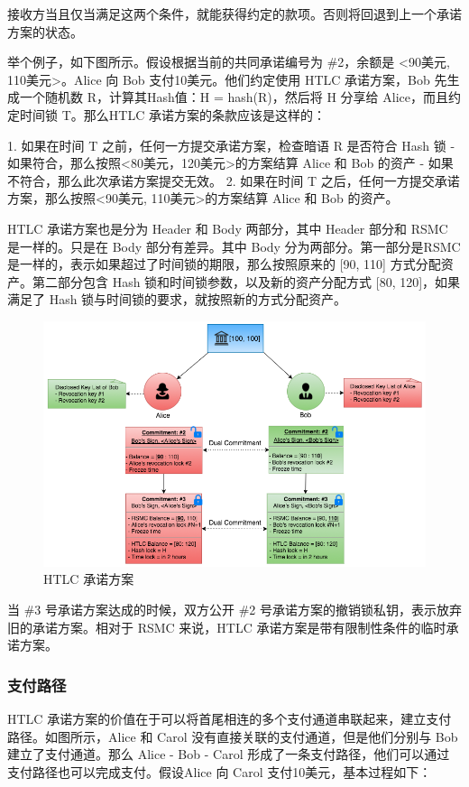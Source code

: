 接收方当且仅当满足这两个条件，就能获得约定的款项。否则将回退到上一个承诺方案的状态。

举个例子，如下图所示。假设根据当前的共同承诺编号为 \#2，余额是 <90美元, 110美元>。Alice 向 Bob 支付10美元。他们约定使用 HTLC 承诺方案，Bob 先生成一个随机数 R，计算其Hash值：H = hash(R)，然后将 H 分享给 Alice，而且约定时间锁 T。那么HTLC 承诺方案的条款应该是这样的：

1. 如果在时间 T 之前，任何一方提交承诺方案，检查暗语 R 是否符合 Hash 锁
- 如果符合，那么按照<80美元，120美元>的方案结算 Alice 和 Bob 的资产
- 如果不符合，那么此次承诺方案提交无效。
2. 如果在时间 T 之后，任何一方提交承诺方案，那么按照<90美元, 110美元>的方案结算 Alice 和 Bob 的资产。

HTLC 承诺方案也是分为 Header 和 Body 两部分，其中 Header 部分和 RSMC 是一样的。只是在 Body 部分有差异。其中 Body 分为两部分。第一部分是RSMC 是一样的，表示如果超过了时间锁的期限，那么按照原来的 [90, 110] 方式分配资产。第二部分包含 Hash 锁和时间锁参数，以及新的资产分配方式 [80, 120]，如果满足了 Hash 锁与时间锁的要求，就按照新的方式分配资产。

\begin{figure}[h!]
    \centering
    \includegraphics[width=16cm, keepaspectratio]{../images/htlc-1.png}
    \caption{HTLC 承诺方案}
    \label{fig:htlc}
\end{figure}

当 \#3 号承诺方案达成的时候，双方公开 \#2 号承诺方案的撤销锁私钥，表示放弃旧的承诺方案。相对于 RSMC 来说，HTLC 承诺方案是带有限制性条件的临时承诺方案。

\subsubsection{支付路径}
HTLC 承诺方案的价值在于可以将首尾相连的多个支付通道串联起来，建立支付路径。如图所示，Alice 和 Carol 没有直接关联的支付通道，但是他们分别与 Bob 建立了支付通道。那么 Alice - Bob - Carol 形成了一条支付路径，他们可以通过支付路径也可以完成支付。假设Alice 向 Carol 支付10美元，基本过程如下：

